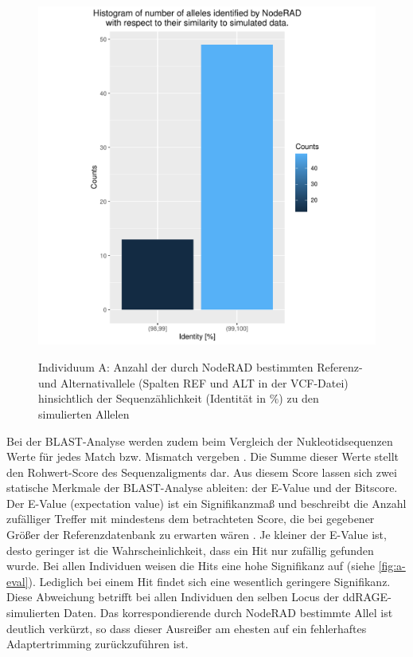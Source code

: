 \begin{figure}[H]
	\begin{center}
		\includegraphics[height=12cm]{bilder/evaluation/hist_perc_ident/A.plot_hist.pdf}
		\caption{Individuum A: Anzahl der durch NodeRAD bestimmten Referenz- und Alternativallele (Spalten REF und ALT in der VCF-Datei) hinsichtlich der Sequenzählichkeit (Identität in $ \% $) zu den simulierten Allelen}
		\label{fig:a-hist}
	\end{center}
\end{figure}


Bei der BLAST-Analyse werden zudem beim Vergleich der Nukleotidsequenzen Werte für jedes Match bzw. Mismatch vergeben \cite{gaedeke_2007}. Die Summe dieser Werte stellt den Rohwert-Score des Sequenzaligments dar. Aus diesem Score lassen sich zwei statische Merkmale der BLAST-Analyse ableiten: der E-Value und der Bitscore. \\

Der E-Value (expectation value) ist ein Signifikanzmaß und beschreibt die Anzahl zufälliger Treffer mit mindestens dem betrachteten Score, die bei gegebener Größer der Referenzdatenbank zu erwarten wären \cite{gaedeke_2007}. Je kleiner der E-Value ist, desto geringer ist die Wahrscheinlichkeit, dass ein Hit nur zufällig gefunden wurde. Bei allen Individuen weisen die Hits eine hohe Signifikanz auf (siehe \autoref{fig:a-eval}). Lediglich bei einem Hit findet sich eine wesentlich geringere Signifikanz. Diese Abweichung betrifft bei allen Individuen den selben Locus der ddRAGE-simulierten Daten. Das korrespondierende durch NodeRAD bestimmte Allel ist deutlich verkürzt, so dass dieser Ausreißer am ehesten auf ein fehlerhaftes Adaptertrimming zurückzuführen ist.\\

